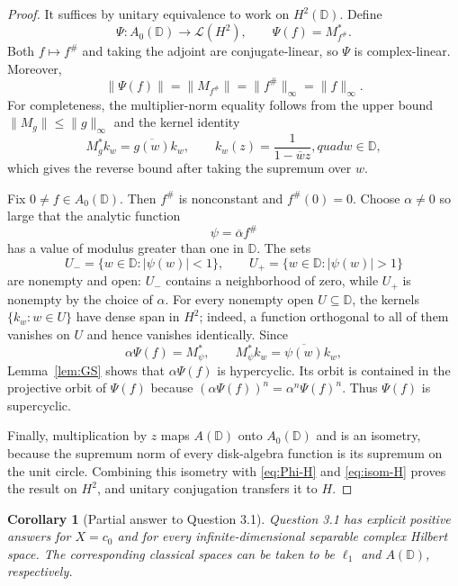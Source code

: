 \documentclass[11pt]{article}
\newtheorem{corollary}[theorem]{Corollary}
\newcommand{\D}{\mathbb D}
\newcommand{\Lcal}{\mathcal L}
\begin{document}
\begin{proof}
It suffices by unitary equivalence to work on $H^2(\D)$. Define
\begin{equation}\label{eq:Phi-H}
 \Psi:A_0(\D)\longrightarrow\Lcal(H^2),
 \qquad
 \Psi(f)=M_{f^\#}^{*}.
\end{equation}
Both $f\mapsto f^\#$ and taking the adjoint are conjugate-linear, so $\Psi$
is complex-linear. Moreover,
\begin{equation}\label{eq:isom-H}
 \|\Psi(f)\|=\|M_{f^\#}\|=\|f^\#\|_\infty=\|f\|_\infty.
\end{equation}
For completeness, the multiplier-norm equality follows from the upper bound
$\|M_g\|\leq\|g\|_\infty$ and the kernel identity
\[
 M_g^*k_w=\overline{g(w)}k_w,
 \qquad
 k_w(z)=\frac{1}{1-\overline wz},quad w\in\D,
\]
which gives the reverse bound after taking the supremum over $w$.

Fix $0\neq f\in A_0(\D)$. Then $f^\#$ is nonconstant and
$f^\#(0)=0$. Choose $\alpha\neq0$ so large that the analytic function
\[
 \psi=\overline\alpha f^\#
\]
has a value of modulus greater than one in $\D$. The sets
\[
 U_- =\{w\in\D:|\psi(w)|<1\},
 \qquad
 U_+ =\{w\in\D:|\psi(w)|>1\}
\]
are nonempty and open: $U_-$ contains a neighborhood of zero, while $U_+$
is nonempty by the choice of $\alpha$. For every nonempty open
$U\subseteq\D$, the kernels $\{k_w:w\in U\}$ have dense span in $H^2$;
indeed, a function orthogonal to all of them vanishes on $U$ and hence
vanishes identically. Since
\[
 \alpha\Psi(f)=M_\psi^*,
 \qquad
 M_\psi^*k_w=\overline{\psi(w)}k_w,
\]
Lemma~\ref{lem:GS} shows that $\alpha\Psi(f)$ is hypercyclic. Its orbit is
contained in the projective orbit of $\Psi(f)$ because
$(\alpha\Psi(f))^n=\alpha^n\Psi(f)^n$. Thus $\Psi(f)$ is supercyclic.

Finally, multiplication by $z$ maps $A(\D)$ onto $A_0(\D)$ and is an
isometry, because the supremum norm of every disk-algebra function is its
supremum on the unit circle. Combining this isometry with \eqref{eq:Phi-H}
and \eqref{eq:isom-H} proves the result on $H^2$, and unitary conjugation
transfers it to $H$.
\end{proof}

\begin{corollary}[Partial answer to Question 3.1]
Question 3.1 has explicit positive answers for $X=c_0$ and for every
infinite-dimensional separable complex Hilbert space. The corresponding
classical spaces can be taken to be $\ell_1$ and $A(\D)$, respectively.
\end{corollary}
\end{document}
